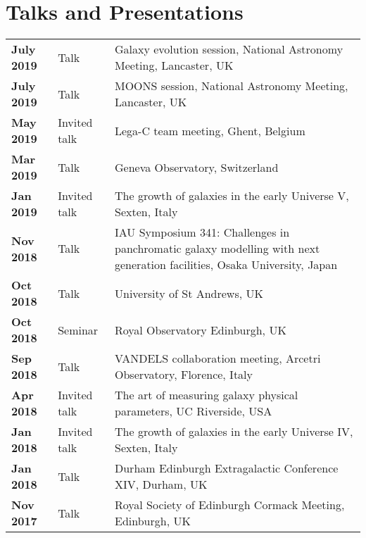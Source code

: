 \documentclass[a4paper,fleqn,usenatbib,onecolumn]{mnras}
\begin{document}
\section*{Talks and Presentations}
\begingroup
\setlength{\tabcolsep}{0pt} %
\renewcommand{\arraystretch}{1.4} %
\begin{longtable}{ p{2.5cm} p{2.5cm} p{12cm} }

\bf{July 2019} & Talk & Galaxy evolution session, National Astronomy Meeting, Lancaster, UK\\

\bf{July 2019} & Talk & MOONS session, National Astronomy Meeting, Lancaster, UK\\

\bf{May 2019} & Invited talk & Lega-C team meeting, Ghent, Belgium\\

\bf{Mar 2019} & Talk & Geneva Observatory, Switzerland\\

\bf{Jan 2019} & Invited talk & The growth of galaxies in the early Universe V, Sexten, Italy\\

\bf{Nov 2018} & Talk & IAU Symposium 341: Challenges in panchromatic galaxy modelling with next generation facilities, Osaka University, Japan\\

\bf{Oct 2018} & Talk & University of St Andrews, UK\\

\bf{Oct 2018} & Seminar & Royal Observatory Edinburgh, UK\\

\bf{Sep 2018} & Talk & VANDELS collaboration meeting, Arcetri Observatory, Florence, Italy\\

\bf{Apr 2018} & Invited talk & The art of measuring galaxy physical parameters, UC Riverside, USA\\

\bf{Jan 2018} & Invited talk & The growth of galaxies in the early Universe IV, Sexten, Italy\\

\bf{Jan 2018} & Talk & Durham Edinburgh Extragalactic Conference XIV, Durham, UK\\

\bf{Nov 2017} & Talk & Royal Society of Edinburgh Cormack Meeting, Edinburgh, UK\\


\end{longtable}
\end{document}
